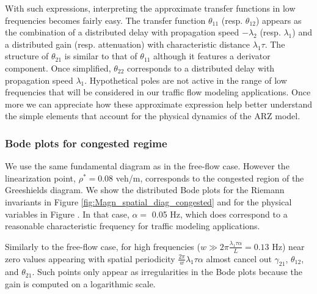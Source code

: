 \documentclass[5p,twocolumn]{elsarticle}
\begin{document}
With such expressions, interpreting the approximate transfer functions in low frequencies becomes fairly easy.
The transfer function $\theta_{11}$ (resp. $\theta_{12}$) appears as the combination of a distributed delay with propagation speed $-\lambda_{2}$ (resp. $\lambda_{1}$) and a distributed gain (resp. attenuation) with characteristic distance $\lambda_{1}\tau$.
The structure of $\theta_{21}$ is similar to that of $\theta_{11}$ although it features a derivator component.
Once simplified, $\theta_{22}$ corresponds to a distributed delay with propagation speed $\lambda_{1}$.
Hypothetical poles are not active in the range of low frequencies that will be considered in our traffic flow modeling applications.
Once more we can appreciate how these approximate expression help better understand the simple elements that account for the physical dynamics of the ARZ model.

\subsubsection{Bode plots for congested regime}
We use the same fundamental diagram as in the free-flow case. However the linearization point, $\rho^* = 0.08$ veh/m, corresponds to the congested region of the Greeshields diagram. We show the distributed Bode plots for the Riemann invariants in Figure \ref{fig:Magn_spatial_diag_congested} and for the physical variables in Figure . In that case, $\alpha =$ 0.05 Hz, which does correspond to a reasonable characteristic frequency for traffic modeling applications.

Similarly to the free-flow case, for high frequencies ($w \gg 2 \pi \frac{\lambda_{1} \tau \alpha}{L} = 0.13$ Hz) near zero values appearing with spatial periodicity $\frac{2 \pi}{w} \lambda_{1} \tau \alpha$ almost cancel out $\gamma_{21}$, $\theta_{12}$, and $\theta_{21}$. Such points only appear as irregularities in the Bode plots because the gain is computed on a logarithmic scale.
\end{document}
